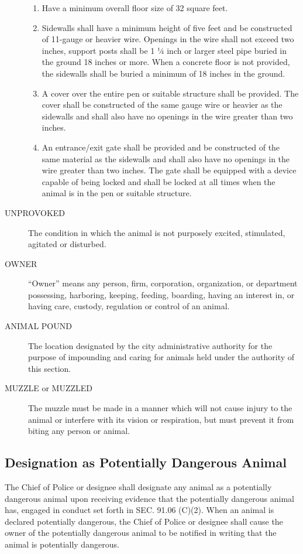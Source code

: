 \begin{description}
\begin{enumerate}
        \item Have a minimum overall floor size of 32 square feet.
        \item Sidewalls shall have a minimum height of five feet and be constructed of 11-gauge or heavier wire.  Openings in the wire shall not exceed two inches, support posts shall be 1 ¼ inch or larger steel pipe buried in the ground 18 inches or more.  When a concrete floor is not provided, the sidewalls shall be buried a minimum of 18 inches in the ground.
        \item A cover over the entire pen or suitable structure shall be provided.  The cover shall be constructed of the same gauge wire or heavier as the sidewalls and shall also have no openings in the wire greater than two inches.
        \item An entrance/exit gate shall be provided and be constructed of the same material as the sidewalls and shall also have no openings in the wire greater than two inches.  The gate shall be equipped with a device capable of being locked and shall be locked at all times when the animal is in the pen or suitable structure.
    \end{enumerate}
    \item[UNPROVOKED] The condition in which the animal is not purposely excited, stimulated, agitated or disturbed.
    \item[OWNER] “Owner” means any person, firm, corporation, organization, or department possessing, harboring, keeping, feeding, boarding, having an interest in, or having care, custody, regulation or control of an animal.
    \item[ANIMAL POUND] The location designated by the city administrative authority for the purpose of impounding and caring for animals held under the authority of this section.
    \item[MUZZLE or MUZZLED] The muzzle must be made in a manner which will not cause injury to the animal or interfere with its vision or respiration, but must prevent it from biting any person or animal.
\end{description}
\subsection{Designation as Potentially Dangerous Animal}
The Chief of Police or designee shall designate any animal as a potentially dangerous animal upon receiving evidence that the potentially dangerous animal has, engaged in conduct set forth in SEC. 91.06 (C)(2).  When an animal is declared potentially dangerous, the Chief of Police or designee shall cause the owner of the potentially dangerous animal to be notified in writing that the animal is potentially dangerous.
